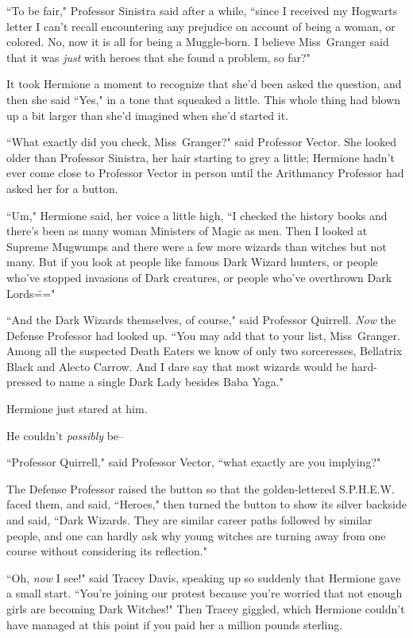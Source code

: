 ``To be fair," Professor Sinistra said after a while, ``since I received my Hogwarts letter I can't recall encountering any prejudice on account of being a woman, or colored. No, now it is all for being a Muggle-born. I believe Miss~Granger said that it was \emph{just} with heroes that she found a problem, so far?"

It took Hermione a moment to recognize that she'd been asked the question, and then she said ``Yes," in a tone that squeaked a little. This whole thing had blown up a bit larger than she'd imagined when she'd started it.

``What exactly did you check, Miss~Granger?" said Professor Vector. She looked older than Professor Sinistra, her hair starting to grey a little; Hermione hadn't ever come close to Professor Vector in person until the Arithmancy Professor had asked her for a button.

``Um," Hermione said, her voice a little high, ``I checked the history books and there's been as many woman Ministers of Magic as men. Then I looked at Supreme Mugwumps and there were a few more wizards than witches but not many. But if you look at people like famous Dark Wizard hunters, or people who've stopped invasions of Dark creatures, or people who've overthrown Dark Lords\==="

``And the Dark Wizards themselves, of course," said Professor Quirrell. \emph{Now} the Defense Professor had looked up. ``You may add that to your list, Miss~Granger. Among all the suspected Death Eaters we know of only two sorceresses, Bellatrix Black and Alecto Carrow. And I dare say that most wizards would be hard-pressed to name a single Dark Lady besides Baba Yaga."

Hermione just stared at him.

He couldn't \emph{possibly} be\---

``Professor Quirrell," said Professor Vector, ``what exactly are you implying?"

The Defense Professor raised the button so that the golden-lettered S.P.H.E.W. faced them, and said, ``Heroes," then turned the button to show its silver backside and said, ``Dark Wizards. They are similar career paths followed by similar people, and one can hardly ask why young witches are turning away from one course without considering its reflection."

``Oh, \emph{now} I see!" said Tracey Davis, speaking up so suddenly that Hermione gave a small start. ``You're joining our protest because you're worried that not enough girls are becoming Dark Witches!" Then Tracey giggled, which Hermione couldn't have managed at this point if you paid her a million pounds sterling.

